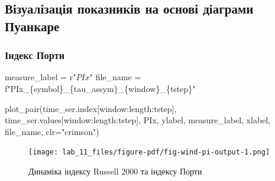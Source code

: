 \documentclass[
  letterpaper,
]{report}
\newenvironment{Shaded}{\begin{snugshade}}{\end{snugshade}}
\newcommand{\NormalTok}[1]{\textcolor[rgb]{0.00,0.23,0.31}{#1}}
\newcommand{\OperatorTok}[1]{\textcolor[rgb]{0.37,0.37,0.37}{#1}}
\newcommand{\SpecialCharTok}[1]{\textcolor[rgb]{0.37,0.37,0.37}{#1}}
\newcommand{\SpecialStringTok}[1]{\textcolor[rgb]{0.13,0.47,0.30}{#1}}
\newcommand{\StringTok}[1]{\textcolor[rgb]{0.13,0.47,0.30}{#1}}
\newcommand{\VerbatimStringTok}[1]{\textcolor[rgb]{0.13,0.47,0.30}{#1}}
\begin{document}
\hypertarget{ux432ux456ux437ux443ux430ux43bux456ux437ux430ux446ux456ux44f-ux43fux43eux43aux430ux437ux43dux438ux43aux456ux432-ux43dux430-ux43eux441ux43dux43eux432ux456-ux434ux456ux430ux433ux440ux430ux43cux438-ux43fux443ux430ux43dux43aux430ux440ux435}{%
\subsection{Візуалізація показників на основі діаграми
Пуанкаре}\label{ux432ux456ux437ux443ux430ux43bux456ux437ux430ux446ux456ux44f-ux43fux43eux43aux430ux437ux43dux438ux43aux456ux432-ux43dux430-ux43eux441ux43dux43eux432ux456-ux434ux456ux430ux433ux440ux430ux43cux438-ux43fux443ux430ux43dux43aux430ux440ux435}}

\hypertarget{ux456ux43dux434ux435ux43aux441-ux43fux43eux440ux442ux438}{%
\subsubsection{Індекс
Порти}\label{ux456ux43dux434ux435ux43aux441-ux43fux43eux440ux442ux438}}

\begin{Shaded}
\begin{Highlighting}[]
\NormalTok{measure\_label }\OperatorTok{=} \VerbatimStringTok{r"$PIx$"}
\NormalTok{file\_name }\OperatorTok{=} \SpecialStringTok{f"PIx\_}\SpecialCharTok{\{}\NormalTok{symbol}\SpecialCharTok{\}}\SpecialStringTok{\_}\SpecialCharTok{\{}\NormalTok{tau\_assym}\SpecialCharTok{\}}\SpecialStringTok{\_}\SpecialCharTok{\{}\NormalTok{window}\SpecialCharTok{\}}\SpecialStringTok{\_}\SpecialCharTok{\{}\NormalTok{tstep}\SpecialCharTok{\}}\SpecialStringTok{"}
\end{Highlighting}
\end{Shaded}

\begin{Shaded}
\begin{Highlighting}[]
\NormalTok{plot\_pair(time\_ser.index[window:length:tstep],}
\NormalTok{          time\_ser.values[window:length:tstep],}
\NormalTok{          PIx, }
\NormalTok{          ylabel, }
\NormalTok{          measure\_label,}
\NormalTok{          xlabel,}
\NormalTok{          file\_name, }
\NormalTok{          clr}\OperatorTok{=}\StringTok{"crimson"}\NormalTok{)}
\end{Highlighting}
\end{Shaded}

\begin{figure}[H]

{\centering \texttt{[image: lab\_11\_files/figure-pdf/fig-wind-pi-output-1.png]}

}

\caption{\label{fig-wind-pi}Динаміка індексу Russell 2000 та індексу
Порти}

\end{figure}
\end{document}
